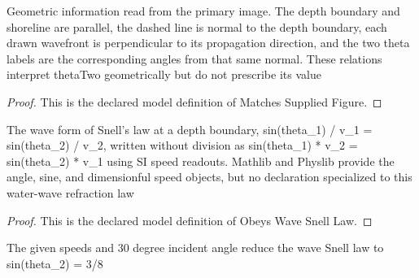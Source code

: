 \begin{definition}
  \label{def:physics:phyx-mini-0174:phyxminiproblems-problemphyxmini0174-matchessuppliedfigure}
  Geometric information read from the primary image. The depth boundary and shoreline are parallel, the dashed line is normal to the depth boundary, each drawn wavefront is perpendicular to its propagation direction, and the two theta labels are the corresponding angles from that same normal. These relations interpret thetaTwo geometrically but do not prescribe its value
\end{definition}
\begin{proof}
  This is the declared model definition of Matches Supplied Figure.
\end{proof}
\begin{definition}
  \label{def:physics:phyx-mini-0174:phyxminiproblems-problemphyxmini0174-obeyswavesnelllaw}
  The wave form of Snell's law at a depth boundary, sin(theta\_1) / v\_1 = sin(theta\_2) / v\_2, written without division as sin(theta\_1) * v\_2 = sin(theta\_2) * v\_1 using SI speed readouts. Mathlib and Physlib provide the angle, sine, and dimensionful speed objects, but no declaration specialized to this water-wave refraction law
\end{definition}
\begin{proof}
  This is the declared model definition of Obeys Wave Snell Law.
\end{proof}
\begin{lemma}
  \label{lem:physics:phyx-mini-0174:phyxminiproblems-problemphyxmini0174-thetatwo-sine-eq-three-eighths}
  The given speeds and 30 degree incident angle reduce the wave Snell law to sin(theta\_2) = 3/8
\end{lemma}
